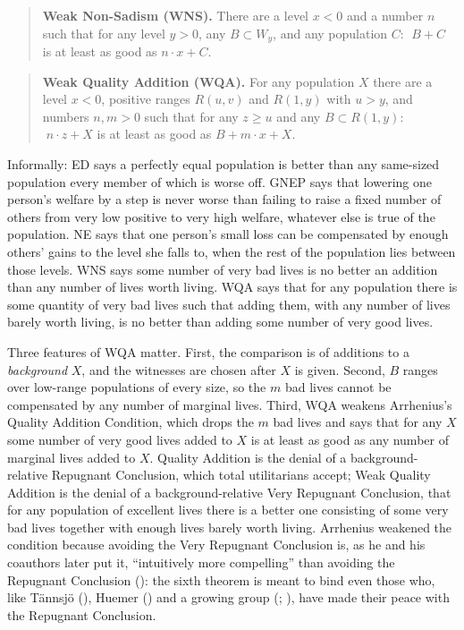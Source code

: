 \documentclass[
  11pt,
  letterpaper,
  DIV=11,
  numbers=noendperiod,
  twoside]{scrartcl}
\begin{document}
\begin{quote}
\textbf{Weak Non-Sadism (WNS).} There are a level \(x < 0\) and a number
\(n\) such that for any level \(y > 0\), any \(B \subset W_y\), and any
population \(C\): \(\;B + C\) is at least as good as \(n \cdot x + C\).
\end{quote}

\begin{quote}
\textbf{Weak Quality Addition (WQA).} For any population \(X\) there are
a level \(x < 0\), positive ranges \(R(u,v)\) and \(R(1,y)\) with
\(u > y\), and numbers \(n, m > 0\) such that for any \(z \geq u\) and
any \(B \subset R(1,y)\): \(\;n \cdot z + X\) is at least as good as
\(B + m \cdot x + X\).
\end{quote}

Informally: ED says a perfectly equal population is better than any
same-sized population every member of which is worse off. GNEP says that
lowering one person's welfare by a step is never worse than failing to
raise a fixed number of others from very low positive to very high
welfare, whatever else is true of the population. NE says that one
person's small loss can be compensated by enough others' gains to the
level she falls to, when the rest of the population lies between those
levels. WNS says some number of very bad lives is no better an addition
than any number of lives worth living. WQA says that for any population
there is some quantity of very bad lives such that adding them, with any
number of lives barely worth living, is no better than adding some
number of very good lives.

Three features of WQA matter. First, the comparison is of additions to a
\emph{background} \(X\), and the witnesses are chosen after \(X\) is
given. Second, \(B\) ranges over low-range populations of every size, so
the \(m\) bad lives cannot be compensated by any number of marginal
lives. Third, WQA weakens Arrhenius's Quality Addition Condition, which
drops the \(m\) bad lives and says that for any \(X\) some number of
very good lives added to \(X\) is at least as good as any number of
marginal lives added to \(X\). Quality Addition is the denial of a
background-relative Repugnant Conclusion, which total utilitarians
accept; Weak Quality Addition is the denial of a background-relative
Very Repugnant Conclusion, that for any population of excellent lives
there is a better one consisting of some very bad lives together with
enough lives barely worth living. Arrhenius weakened the condition
because avoiding the Very Repugnant Conclusion is, as he and his
coauthors later put it, ``intuitively more compelling'' than avoiding
the Repugnant Conclusion
(): the sixth theorem is meant to bind even those who, like Tännsjö
(), Huemer
() and a growing group
(;
), have
made their peace with the Repugnant Conclusion.
\end{document}
